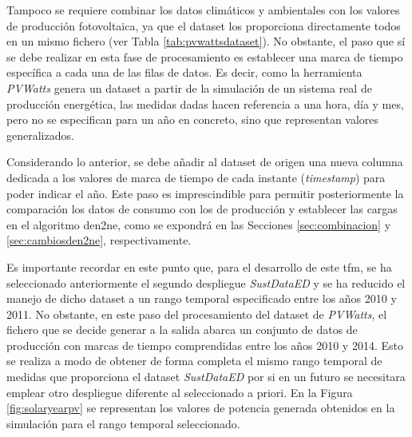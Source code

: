 \vspace{3mm}

Tampoco se requiere combinar los datos climáticos y ambientales con los valores de producción fotovoltaica, ya que el dataset los proporciona directamente todos en un mismo fichero (ver Tabla \ref{tab:pvwattsdataset}). No obstante, el paso que sí se debe realizar en esta fase de procesamiento es establecer una marca de tiempo específica a cada una de las filas de datos. Es decir, como la herramienta \textit{PVWatts} genera un dataset a partir de la simulación de un sistema real de producción energética, las medidas dadas hacen referencia a una hora, día y mes, pero no se especifican para un año en concreto, sino que representan valores generalizados. 

\vspace{3mm}

Considerando lo anterior, se debe añadir al dataset de origen una nueva columna dedicada a los valores de marca de tiempo de cada instante (\textit{timestamp}) para poder indicar el año. Este paso es imprescindible para permitir posteriormente la comparación los datos de consumo con los de producción y establecer las cargas en el algoritmo \gls{den2ne}, como se expondrá en las Secciones \ref{sec:combinacion} y \ref{sec:cambiosden2ne}, respectivamente. 

\vspace{3mm}

Es importante recordar en este punto que, para el desarrollo de este \gls{tfm}, se ha seleccionado anteriormente el segundo despliegue \textit{SustDataED} y se ha reducido el manejo de dicho dataset a un rango temporal especificado entre los años 2010 y 2011. No obstante, en este paso del procesamiento del dataset de \textit{PVWatts}, el fichero que se decide generar a la salida abarca un conjunto de datos de producción con marcas de tiempo comprendidas entre los años 2010 y 2014. Esto se realiza a modo de obtener de forma completa el mismo rango temporal de medidas que proporciona el dataset \textit{SustDataED} por si en un futuro se necesitara emplear otro despliegue diferente al seleccionado a priori. En la Figura \ref{fig:solaryearpv} se representan los valores de potencia generada obtenidos en la simulación para el rango temporal seleccionado.

\vspace{3mm}


